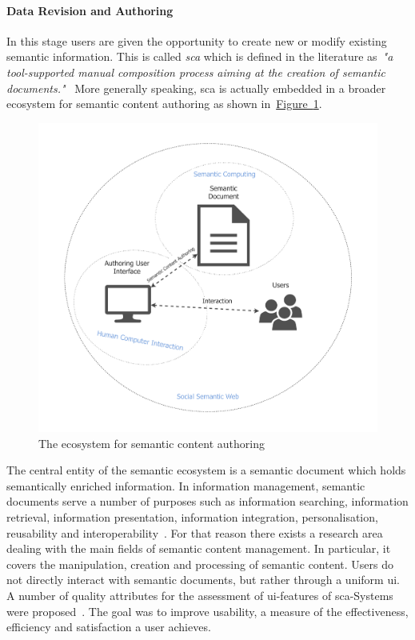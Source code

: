 \paragraph{Data Revision and Authoring} In this stage users are given the opportunity to create new or modify existing semantic information. 
This is called \textit{\gls{sca}} which is defined in the literature as~\textit{"a tool-supported
manual composition process aiming at the creation of semantic documents."}~\cite{khalili2013} More generally speaking, \gls{sca} is actually embedded in a broader ecosystem for semantic content authoring as shown in~\hyperref[fig:authoring_semantic_ecosystem]{Figure~\ref*{fig:authoring_semantic_ecosystem}}. 
\begin{figure}
	 \centering
	 \includegraphics[width=1\textwidth]{drawio/authoring_semantic_ecosystem}
	 \caption{The ecosystem for semantic content authoring}\label{fig:authoring_semantic_ecosystem}
\end{figure}
The central entity of the semantic ecosystem is a semantic document which holds semantically enriched information. 
In information management, semantic documents serve a number of purposes such as information searching, information retrieval, information presentation, information integration, personalisation, reusability and interoperability~\cite{khalili2013}. For that reason there exists a research area dealing with the main fields of semantic content management. In particular, it covers the manipulation, creation and processing of semantic content. Users do not directly interact with semantic documents, but rather through a uniform \gls{ui}. A number of quality attributes for the assessment of \gls{ui}-features of \gls{sca}-Systems were proposed~\cite{khalili2013}. The goal was to improve usability, a measure of the effectiveness, efficiency and satisfaction a user achieves. 

